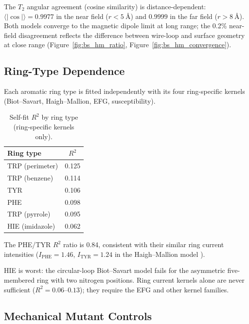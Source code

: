 The $T_2$ angular agreement (cosine similarity) is distance-dependent:
$\langle\lvert\cos\rvert\rangle = 0.9977$ in the near field
($r < \SI{5}{\angstrom}$) and $0.9999$ in the far field
($r > \SI{8}{\angstrom}$).  Both models converge to the magnetic dipole
limit at long range; the 0.2\% near-field disagreement reflects the
difference between wire-loop and surface geometry at close range
(Figure~\ref{fig:bs_hm_ratio}, Figure~\ref{fig:bs_hm_convergence}).


\subsection{Ring-Type Dependence}
\label{ssec:ring-type}

Each aromatic ring type is fitted independently with its four
ring-specific kernels (Biot--Savart, Haigh--Mallion, EFG, susceptibility).

\begin{table}[htbp]
  \centering
  \caption{Self-fit $R^2$ by ring type (ring-specific kernels only).}
  \label{tab:ring-type-r2}
  \begin{tabular}{lc}
    \toprule
    Ring type & $R^2$ \\
    \midrule
    TRP (perimeter)  & 0.125 \\
    TRP (benzene)    & 0.114 \\
    TYR              & 0.106 \\
    PHE              & 0.098 \\
    TRP (pyrrole)    & 0.095 \\
    HIE (imidazole)  & 0.062 \\
    \bottomrule
  \end{tabular}
\end{table}

The PHE/TYR $R^2$ ratio is 0.84, consistent with their similar ring
current intensities ($I_{\text{PHE}} = 1.46$, $I_{\text{TYR}} = 1.24$
in the Haigh--Mallion model \cite{case1995}).

HIE is worst: the circular-loop Biot--Savart model fails for the
asymmetric five-membered ring with two nitrogen positions.  Ring current
kernels alone are never sufficient ($R^2 = 0.06$--$0.13$); they require
the EFG and other kernel families.


\subsection{Mechanical Mutant Controls}
\label{ssec:controls}

